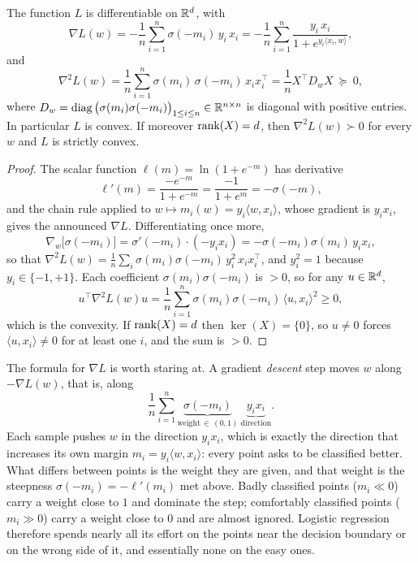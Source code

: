 \begin{prop}
\label{prop:logistic-grad}
The function $L$ is differentiable on $\mathbb{R}^d$, with
\[
\nabla L(w) = - \frac{1}{n} \sum_{i=1}^n \sigma(-m_i) \, y_i \, x_i
= - \frac{1}{n} \sum_{i=1}^n \frac{y_i \, x_i}{1 + e^{y_i \langle x_i, w \rangle}} ,
\]
and
\[
\nabla^2 L(w) = \frac{1}{n} \sum_{i=1}^n \sigma(m_i)\,\sigma(-m_i)\, x_i x_i^\top
= \frac{1}{n} X^\top D_w X \ \succeq \ 0 ,
\]
where $D_w = \mathop{\rm diag}\big( \sigma(m_i) \sigma(-m_i) \big)_{1 \leq i \leq n} \in \mathbb{R}^{n
\times n}$ is diagonal with positive entries.
In particular $L$ is convex. If moreover $\operatorname{rank}(X) = d$, then $\nabla^2 L(w) \succ 0$
for every $w$ and $L$ is strictly convex.
\end{prop}

\begin{proof}
The scalar function $\ell(m) = \ln(1 + e^{-m})$ has derivative
\[
\ell'(m) = \frac{-e^{-m}}{1 + e^{-m}} = \frac{-1}{1 + e^{m}} = -\sigma(-m) ,
\]
and the chain rule applied to $w \mapsto m_i(w) = y_i \langle w, x_i\rangle$, whose
gradient is $y_i x_i$, gives the announced $\nabla L$. Differentiating once more,
\[
\nabla_w \big[ \sigma(-m_i) \big] = \sigma'(-m_i) \cdot (-y_i x_i)
= - \sigma(-m_i)\sigma(m_i) \, y_i x_i ,
\]
so that $\nabla^2 L(w) = \frac1n \sum_i \sigma(m_i)\sigma(-m_i) \, y_i^2 \, x_i
x_i^\top$, and $y_i^2 = 1$ because $y_i \in \{-1,+1\}$. Each coefficient
$\sigma(m_i)\sigma(-m_i)$ is $> 0$, so for any $u \in \mathbb{R}^d$,
\[
u^\top \nabla^2 L(w) u = \frac1n \sum_{i=1}^n \sigma(m_i)\sigma(-m_i) \, \langle u, x_i \rangle^2 \geq 0 ,
\]
which is the convexity. If $\operatorname{rank}(X) = d$ then $\ker(X) = \{0\}$, so $u \neq 0$ forces
$\langle u, x_i \rangle \neq 0$ for at least one $i$, and the sum is $> 0$.
\end{proof}

\begin{remark}
The formula for $\nabla L$ is worth staring at. A gradient \emph{descent} step moves
$w$ along $-\nabla L(w)$, that is, along
\[
\frac{1}{n} \sum_{i=1}^n \underbrace{\sigma(-m_i)}_{\text{weight} \, \in \, (0,1)} \ \underbrace{y_i x_i}_{\text{direction}} .
\]
Each sample pushes $w$ in the direction $y_i x_i$, which is exactly the direction that
increases its own margin $m_i = y_i \langle w, x_i \rangle$: every point asks to be
classified better. What differs between points is the weight they are given, and that
weight is the steepness $\sigma(-m_i) = -\ell'(m_i)$ met above. Badly classified points
($m_i \ll 0$) carry a weight close to $1$ and dominate the step; comfortably classified
points ($m_i \gg 0$) carry a weight close to $0$ and are almost ignored. Logistic
regression therefore spends nearly all its effort on the points near the decision
boundary or on the wrong side of it, and essentially none on the easy ones.
\end{remark}

